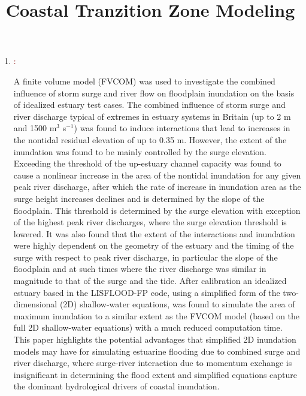 \documentclass[a4paper, 12pt]{article}
\title{Coastal Tranzition Zone Modeling}
\begin{document}
\maketitle
    
\begin{enumerate}
\item \textcolor{Maroon}{\textbf{\cite{Maskell_2014}}:}

A finite volume model (FVCOM) was used to investigate the combined influence of storm surge and river flow on floodplain inundation on the basis of idealized estuary test cases. The combined influence of storm surge and river discharge typical of extremes in estuary systems in Britain (up to 2 m and 1500 m$^3$ s$^{-1}$) was found to induce interactions that lead to increases in the nontidal residual elevation of up to 0.35 m. However, the extent of the inundation was found to be mainly controlled by the surge elevation. Exceeding the threshold of the up-estuary channel capacity was found to cause a nonlinear increase in the area of the nontidal inundation for any given peak river discharge, after which the rate of increase in inundation area as the surge height increases declines and is determined by the slope of the floodplain. This threshold is determined by the surge elevation with exception of the highest peak river discharges, where the surge elevation threshold is lowered. It was also found that the extent of the interactions and inundation were highly dependent on the geometry of the estuary and the timing of the surge with respect to peak river discharge, in particular the slope of the floodplain and at such times where the river discharge was similar in magnitude to that of the surge and the tide. After calibration an idealized estuary based in the LISFLOOD-FP code, using a simplified form of the two-dimensional (2D) shallow-water equations, was found to simulate the area of maximum inundation to a similar extent as the FVCOM model (based on the full 2D shallow-water equations) with a much reduced computation time. This paper highlights the potential advantages that simplified 2D inundation models may have for simulating estuarine flooding due to combined surge and river discharge, where surge-river interaction due to momentum exchange is insignificant in determining the flood extent and simplified equations capture the dominant hydrological drivers of coastal inundation.

\end{enumerate}
\end{document}
